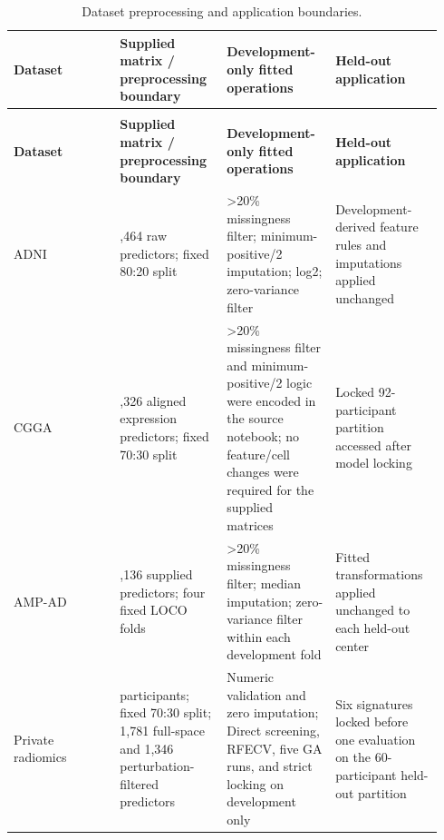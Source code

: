 {
\small
\renewcommand{\arraystretch}{1.08}
\setlength{\tabcolsep}{2.2pt}
\begin{longtable}{@{}>{\raggedright\arraybackslash}p{0.2350\linewidth}>{\centering\arraybackslash}p{0.2350\linewidth}>{\centering\arraybackslash}p{0.2350\linewidth}>{\raggedright\arraybackslash}p{0.2350\linewidth}@{}}
\caption{Dataset preprocessing and application boundaries.}\label{tab:supp1}\\
\toprule
\bfseries Dataset & \bfseries Supplied matrix / preprocessing boundary & \bfseries Development-only fitted operations & \bfseries Held-out application \\
\midrule
\endfirsthead
\multicolumn{4}{l}{\footnotesize\itshape \tablename~\thetable\ (continued)}\\
\toprule
\bfseries Dataset & \bfseries Supplied matrix / preprocessing boundary & \bfseries Development-only fitted operations & \bfseries Held-out application \\
\midrule
\endhead
\bottomrule
\endfoot
ADNI & 7,464 raw predictors; fixed 80:20 split & >20\% missingness filter; minimum-positive/2 imputation; log2; zero-variance filter & Development-derived feature rules and imputations applied unchanged \\
CGGA & 24,326 aligned expression predictors; fixed 70:30 split & >20\% missingness filter and minimum-positive/2 logic were encoded in the source notebook; no feature/cell changes were required for the supplied matrices & Locked 92-participant partition accessed after model locking \\
AMP-AD & 13,136 supplied predictors; four fixed LOCO folds & >20\% missingness filter; median imputation; zero-variance filter within each development fold & Fitted transformations applied unchanged to each held-out center \\
Private radiomics & 197 participants; fixed 70:30 split; 1,781 full-space and 1,346 perturbation-filtered predictors & Numeric validation and zero imputation; Direct screening, RFECV, five GA runs, and strict locking on development only & Six signatures locked before one evaluation on the 60-participant held-out partition \\
\end{longtable}
}

